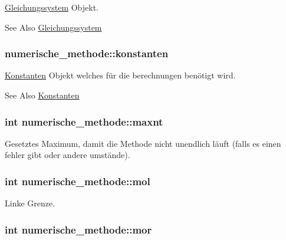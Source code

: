 \hyperlink{classGleichungssystem}{Gleichungssystem} Objekt. \begin{DoxySeeAlso}{See Also}
\hyperlink{classGleichungssystem}{Gleichungssystem} 
\end{DoxySeeAlso}
\hypertarget{classnumerische__methode_a54c65c639dc4ea722d6f84ed6ff4c75b}{
\subsubsection[{konstanten}]{ numerische\-\_\-methode\-::konstanten\hspace{0.3cm}{\ttfamily [protected]}}}\label{classnumerische__methode_a54c65c639dc4ea722d6f84ed6ff4c75b}
\hyperlink{classKonstanten}{Konstanten} Objekt welches für die berechnungen benötigt wird. \begin{DoxySeeAlso}{See Also}
\hyperlink{classKonstanten}{Konstanten} 
\end{DoxySeeAlso}
\hypertarget{classnumerische__methode_ae52e51b4b4607ee26d4cc9bac2f61922}{
\subsubsection[{maxnt}]{\setlength{\rightskip}{0pt plus 5cm}int numerische\-\_\-methode\-::maxnt\hspace{0.3cm}{\ttfamily [protected]}}}\label{classnumerische__methode_ae52e51b4b4607ee26d4cc9bac2f61922}
Gesetztes Maximum, damit die Methode nicht unendlich läuft (falls es einen fehler gibt oder andere umstände). \hypertarget{classnumerische__methode_a6ffb8741f1f1d5975994cb006d436d8f}{
\subsubsection[{mol}]{\setlength{\rightskip}{0pt plus 5cm}int numerische\-\_\-methode\-::mol\hspace{0.3cm}{\ttfamily [protected]}}}\label{classnumerische__methode_a6ffb8741f1f1d5975994cb006d436d8f}
Linke Grenze. \hypertarget{classnumerische__methode_ab33e0205421976197d24355cf010bfe8}{
\subsubsection[{mor}]{\setlength{\rightskip}{0pt plus 5cm}int numerische\-\_\-methode\-::mor\hspace{0.3cm}{\ttfamily [protected]}}}\label{classnumerische__methode_ab33e0205421976197d24355cf010bfe8}
